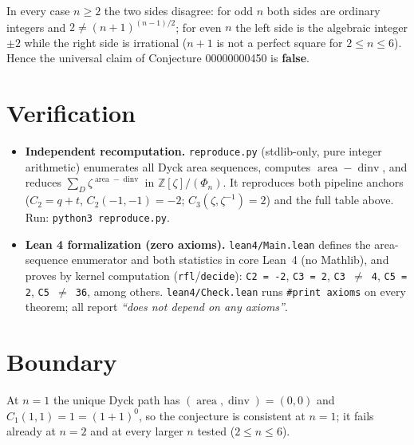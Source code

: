 \documentclass[11pt]{article}
\begin{document}
In every case $n\ge2$ the two sides disagree: for odd $n$ both sides are
ordinary integers and $2\ne(n+1)^{(n-1)/2}$; for even $n$ the left side is the
algebraic integer $\pm2$ while the right side is irrational
($n+1$ is not a perfect square for $2\le n\le 6$). Hence the universal claim
of Conjecture 00000000450 is \textbf{false}.

\section{Verification}

\begin{itemize}
  \item \textbf{Independent recomputation.} \texttt{reproduce.py} (stdlib-only,
  pure integer arithmetic) enumerates all Dyck area sequences, computes
  $\operatorname{area}-\operatorname{dinv}$, and reduces
  $\sum_D \zeta^{\operatorname{area}-\operatorname{dinv}}$ in
  $\mathbb{Z}[\zeta]/(\Phi_n)$. It reproduces both pipeline anchors
  ($C_2=q+t$, $C_2(-1,-1)=-2$; $C_3(\zeta,\zeta^{-1})=2$) and the full table above.
  Run: \texttt{python3 reproduce.py}.
  \item \textbf{Lean 4 formalization (zero axioms).} \texttt{lean4/Main.lean}
  defines the area-sequence enumerator and both statistics in core Lean~4
  (no Mathlib), and proves by kernel computation (\texttt{rfl}/\texttt{decide}):
  \texttt{C2 = -2}, \texttt{C3 = 2}, \texttt{C3 $\ne$ 4}, \texttt{C5 = 2},
  \texttt{C5 $\ne$ 36}, among others. \texttt{lean4/Check.lean} runs
  \texttt{\#print axioms} on every theorem; all report
  \emph{``does not depend on any axioms''}.
\end{itemize}

\section{Boundary}

At $n=1$ the unique Dyck path has $(\operatorname{area},\operatorname{dinv})=(0,0)$
and $C_1(1,1)=1=(1+1)^{0}$, so the conjecture is consistent at $n=1$; it fails
already at $n=2$ and at every larger $n$ tested ($2\le n\le 6$).
\end{document}
